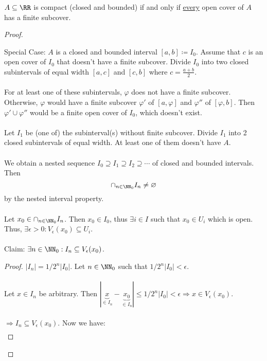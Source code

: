 \documentclass[class=scrartcl, crop=false]{standalone}
\begin{document}
\begin{theorem}
  $A \subseteq \RR$ is compact (closed and bounded) if and only if \ul{every} open cover of $A$ has a finite subcover.
  \begin{proof}
    \begin{itemize}
      \ii[]
      \ii[$\Rightarrow$]
      Special Case: $A$ is a closed and bounded interval $[a, b] \coloneqq I_0$. Assume that $c$ is an open cover of $I_0$ that doesn't have a finite subcover. Divide $I_0$ into two closed subintervals of equal width $[a, c]$ and $[c, b]$ where $c = \frac{a + b}{2}$.
      \\\\
      For at least one of these subintervals, $\varphi$ does not have a finite subcover. Otherwise, $\varphi$ would have a finite subcover $\varphi'$ of $[a, \varphi]$ and $\varphi''$ of $[\varphi, b]$. Then $\varphi' \cup \varphi''$ would be a finite open cover of $I_0$, which doesn't exist.
      \\\\
      Let $I_1$ be (one of) the subinterval(s) without finite subcover. Divide $I_1$ into 2 closed subintervals of equal width. At least one of them doesn't have $A$.
      \\\\
      We obtain a nested sequence $I_0 \supseteq I_1 \supseteq I_2 \supseteq \cdots$ of closed and bounded intervals. Then  
      \[
        \cap_{n \in \NN_0}I_n \neq \varnothing
      \] by the nested interval property.
      \\\\
      Let $x_0 \in \cap_{n \in \NN_0}I_n$. Then $x_0 \in I_0$, thus $\exists i \in I$ such that $x_0 \in U_i$ which is open. Thus, $\exists \epsilon > 0 : V_\epsilon(x_0) \subseteq U_i$.
      \\\\
      Claim: $\exists n \in \NN_0 : I_n \subseteq V_\epsilon(x_0)$.
      \begin{proof}
        $|I_n| = 1 / 2^n |I_0|$. Let $n \in \NN_0$ such that $1 / 2^n |I_0| < \epsilon$.
        \\\\
        Let $x \in I_n$ be arbitrary. Then $|\underbrace{x}_{\in I_n} - \underbrace{x_0}_{\in I_n} | \leq 1 / 2^n |I_0| < \epsilon \Rightarrow x \in V_\epsilon(x_0)$.
        \\\\
        $\Rightarrow I_n \subseteq V_\epsilon(x_0)$. Now we have:
        \begin{gather*}

\end{gather*}
\end{proof}
\end{itemize}
\end{proof}
\end{theorem}
\end{document}
